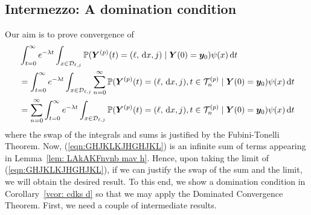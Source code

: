 \subsection{Intermezzo: A domination condition}
Our aim is to prove convergence of 
\begin{align} 
	&\int_{t=0}^\infty e^{-\lambda t}\int_{x\in\mathcal{D}_{\ell,j}}\mathbb P({\boldsymbol Y}^{(p)}(t) = (\ell,\, \mathrm{d} x, j) \mid  \nonumber 
	\boldsymbol Y(0) = \boldsymbol y_0)\psi(x)\, \mathrm{d} t \nonumber
	\\&=\int_{t=0}^\infty e^{-\lambda t}\int_{x\in\mathcal{D}_{\ell,j}}\sum_{n=0}^\infty\mathbb P({\boldsymbol Y}^{(p)}(t) = (\ell,\, \mathrm{d} x, j), t\in\mathcal T_n^{(p)} \mid  \nonumber 
	\boldsymbol Y(0) = \boldsymbol y_0)\psi(x)\, \mathrm{d} t \nonumber
	\\&=\sum_{n=0}^\infty\int_{t=0}^\infty e^{-\lambda t}\int_{x\in\mathcal{D}_{\ell,j}}\mathbb P({\boldsymbol Y}^{(p)}(t) = (\ell,\, \mathrm{d} x, j), t\in\mathcal T_n^{(p)} \mid   
	\boldsymbol Y(0) = \boldsymbol y_0)\psi(x)\, \mathrm{d} t \label{eqn:GHJKLKJHGHJKL}
\end{align}
where the swap of the integrals and sums is justified by the Fubini-Tonelli Theorem. Now, (\ref{eqn:GHJKLKJHGHJKL}) is an infinite sum of terms appearing in Lemma~\ref{lem: LAkAKFnvnb mav h}. Hence, upon taking the limit of (\ref{eqn:GHJKLKJHGHJKL}), if we can justify the swap of the sum and the limit, we will obtain the desired result. To this end, we show a domination condition in Corollary~\ref{vcor: cdks d} so that we may apply the Dominated Convergence Theorem. First, we need a couple of intermediate results. %



